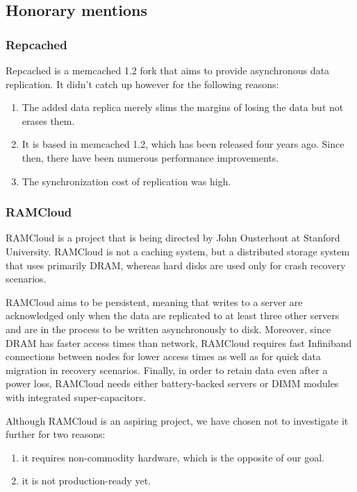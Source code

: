 \subsection{Honorary mentions}

\subsubsection{Repcached}

Repcached is a memcached 1.2 fork that aims to provide asynchronous data 
replication. It didn't catch up however for the following reasons:

\begin{enumerate}
	\item The added data replica merely slims the margins of losing the data 
		but not erases them.
	\item It is based in memcached 1.2, which has been released four years ago.  
		Since then, there have been numerous performance improvements.
	\item The synchronization cost of replication was high.
\end{enumerate}

\subsubsection{RAMCloud}

RAMCloud\cite{ramcloud} is a project that is being directed by John Ousterhout 
at Stanford University. RAMCloud is not a caching system, but a distributed 
storage system that uses primarily DRAM, whereas hard disks are used only for 
crash recovery scenarios\cite{recovery-ramcloud}.

RAMCloud aims to be persistent, meaning that writes to a server are 
acknowledged only when the data are replicated to at least three other servers 
and are in the process to be written asynchronously to disk. Moreover, since 
DRAM has faster access times than network, RAMCloud requires fast Infiniband 
connections between nodes for lower access times as well as for quick data 
migration in recovery scenarios. Finally, in order to retain data even after a 
power loss, RAMCloud needs either battery-backed servers or DIMM modules with 
integrated super-capacitors.

Although RAMCloud is an aspiring project, we have chosen not to investigate it 
further for two reasons:

\begin{enumerate}
	\item it requires non-commodity hardware, which is the opposite of our 
		goal.
	\item it is not production-ready yet.
\end{enumerate}

